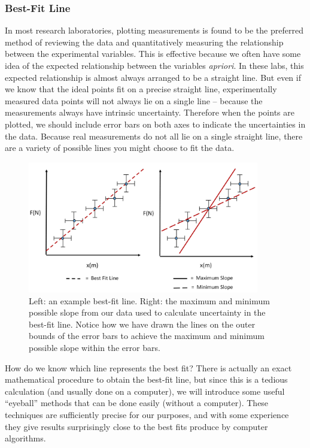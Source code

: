 \subsubsection{Best-Fit Line}

In most research laboratories, plotting measurements is found to be the preferred method of reviewing the data and quantitatively measuring the relationship between the experimental variables. This is effective because we often have some idea of the expected relationship between the variables {\it{apriori}}. In these labs, this expected relationship is almost always arranged to be a straight line. But even if we know that the ideal points fit on a precise straight line, experimentally measured data points will not always lie on a single line -- because the measurements always have intrinsic uncertainty. Therefore when the points are plotted, we should include error bars on both axes to indicate the uncertainties in the data. Because real measurements do not all lie on a single straight line, there are a variety of possible lines you might choose to fit the data. \myskip

\begin{figure}[h]
    \begin{center}
        \includegraphics[width=0.9\textwidth, height=0.5\textwidth]{./Exp3/pic/image13.jpg}
    \end{center}
    \caption{Left: an example best-fit line. Right: the maximum and minimum possible slope from our data used to calculate uncertainty in the best-fit line. Notice how we have drawn the lines on the outer bounds of the error bars to achieve the maximum and minimum possible slope within the error bars.}
    \label{fig:bestfit}
\end{figure}

How do we know which line represents the best fit?  There is actually an exact mathematical procedure to obtain the best-fit line, but since this is a tedious calculation (and usually done on a computer), we will introduce some useful ``eyeball'' methods that can be done easily (without a computer). These techniques are sufficiently precise for our purposes, and with some experience they give results surprisingly close to the best fits produce by computer algorithms. \myskip


